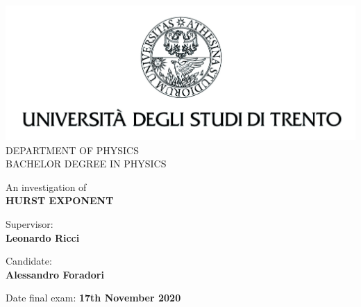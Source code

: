 \begin{titlepage}
	\begin{center}
		\includegraphics{10000000000004E1000001E114DE41E38E5F0A34.jpg}
		\\ \vspace{5mm}
		{{ DEPARTMENT OF PHYSICS }} 
		\\ \vspace{5mm}
		{{ BACHELOR DEGREE IN PHYSICS }}
	\end{center}
	\vspace{30mm}
	\begin{center}
		{\huge{An investigation of 
				\\ \vspace{2.5mm}
				\bf HURST EXPONENT}}
	\end{center}
	\vspace{35mm}
	\par\noindent
	\begin{minipage}[t]{0.47\textwidth}
		\centering
		{\large{Supervisor:} 
			\\ \vspace{1.5mm}
			\Large{\bf Leonardo Ricci}}
	\end{minipage}
	\hfill
	\begin{minipage}[t]{0.47\textwidth}\centering
		{\large{Candidate:} 
			\\ \vspace{1.5mm}
			 \Large{\bf Alessandro Foradori}}
	\end{minipage}
	
	\vfill
	{\large{ Date final exam: \bf 17th November 2020\\}}

\end{titlepage}